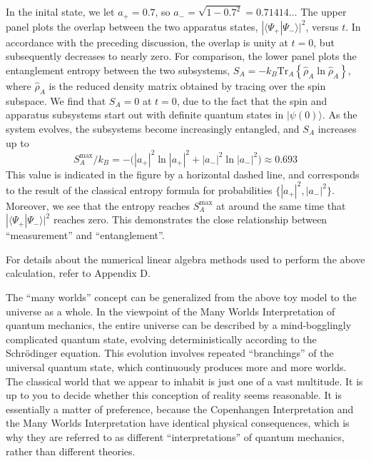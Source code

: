 \documentclass[pra,12pt]{revtex4}
\begin{document}
In the inital state, we let $a_+ = 0.7$, so $a_- = \sqrt{1-0.7^2} =
0.71414\dots$ The upper panel plots the overlap between the two
apparatus states, $|\langle\Psi_+|\Psi_-\rangle|^2$, versus $t$.  In
accordance with the preceding discussion, the overlap is unity at $t =
0$, but subsequently decreases to nearly zero.  For comparison, the
lower panel plots the entanglement entropy between the two subsystems,
$S_A = -k_B \mathrm{Tr}_A\left\{\hat{\rho}_A\ln\hat{\rho}_A\right\}$,
where $\hat{\rho}_A$ is the reduced density matrix obtained by tracing
over the spin subspace.  We find that $S_A = 0$ at $t=0$, due to the
fact that the spin and apparatus subsystems start out with definite
quantum states in $|\psi(0)\rangle$.  As the system evolves, the
subsystems become increasingly entangled, and $S_A$ increases up to
\begin{equation}
  S_A^{\mathrm{max}}/k_B = - \Big( |a_+|^2 \ln|a_+|^2 + |a_-|^2\ln|a_-|^2 \Big) \approx 0.693
\end{equation}
This value is indicated in the figure by a horizontal dashed line, and
corresponds to the result of the classical entropy formula for
probabilities $\{|a_+|^2,|a_-|^2\}$.  Moreover, we see that the
entropy reaches $S_A^{\mathrm{max}}$ at around the same time that
$|\langle\Psi_+|\Psi_-\rangle|^2$ reaches zero.  This demonstrates the
close relationship between ``measurement'' and ``entanglement''.

For details about the numerical linear algebra methods used to perform
the above calculation, refer to Appendix D.

The ``many worlds'' concept can be generalized from the above toy
model to the universe as a whole.  In the viewpoint of the Many Worlds
Interpretation of quantum mechanics, the entire universe can be
described by a mind-bogglingly complicated quantum state, evolving
deterministically according to the Schr\"odinger equation.  This
evolution involves repeated ``branchings'' of the universal quantum
state, which continuously produces more and more worlds.  The
classical world that we appear to inhabit is just one of a vast
multitude.  It is up to you to decide whether this conception of
reality seems reasonable.  It is essentially a matter of preference,
because the Copenhangen Interpretation and the Many Worlds
Interpretation have identical physical consequences, which is why they
are referred to as different ``interpretations'' of quantum mechanics,
rather than different theories.
\end{document}
